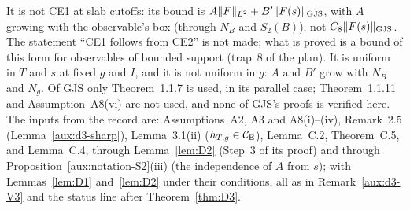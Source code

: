 \begin{auxrem}\label{aux:d3-not}
It is not CE1 at slab cutoffs: its bound is $A\|F\|_{L^2}+B'\lVert F(s)\rVert_{\mathrm{GJS}}$, with $A$ growing with
the observable's box (through $N_B$ and $S_2(B)$), not $C_8\lVert F(s)\rVert_{\mathrm{GJS}}$.  The statement ``CE1
follows from CE2'' is not made; what is proved is a bound of this form for observables of bounded
support (trap~8 of the plan).  It is uniform in $T$ and $s$ at fixed $g$ and $I$, and it is not
uniform in $g$: $A$ and $B'$ grow with $N_B$ and $N_g$.  Of GJS only Theorem~1.1.7 is used, in its
parallel case; Theorem~1.1.11 and Assumption~A8(vi) are not used, and none of GJS's proofs is
verified here.  The inputs from the record are: Assumptions~A2, A3 and A8(i)--(iv), Remark~2.5
(Lemma~\ref{aux:d3-sharp}), Lemma~3.1(ii) ($h_{T,g}\in\mathcal{C}_{\mathrm E}$), Lemma~C.2, Theorem~C.5, and
Lemma~C.4, through Lemma~\ref{lem:D2} (Step~3 of its proof) and through
Proposition~\ref{aux:notation-S2}(iii) (the independence of $A$ from $s$); with Lemmas~\ref{lem:D1}
and~\ref{lem:D2} under their conditions, all as in Remark~\ref{aux:d3-V3} and the status line
after Theorem~\ref{thm:D3}.
\end{auxrem}
